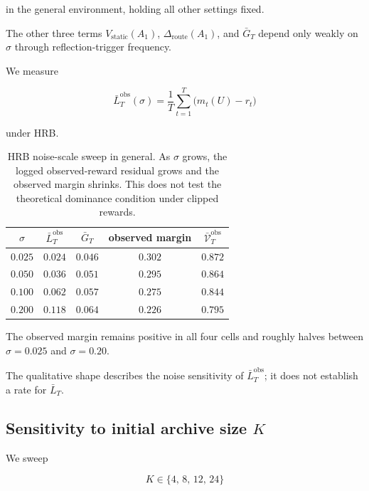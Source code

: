 \documentclass{article} %
\begin{document}
in the general environment, holding all other settings fixed.

The other three terms $V_{\mathrm{static}}(A_1)$, $\Delta_{\mathrm{route}}(A_1)$, and $\bar{G}_T$ depend only weakly on $\sigma$ through reflection-trigger frequency.

We measure

\begin{equation}
\label{eq:app-LT-of-sigma}
\bar L_T^{\mathrm{obs}}(\sigma)
=
\frac{1}{T}\sum_{t=1}^{T}\bigl(m_t(U)-r_t\bigr)
\end{equation}

under HRB.

\begin{table}[h]
\centering
\small
\begin{tabular}{ccccc}
\toprule
$\sigma$ & $\bar L_T^{\mathrm{obs}}$ & $\bar G_T$ & observed margin & $\bar{\mathcal V}_T^{\mathrm{obs}}$ \\
\midrule
$0.025$ & $0.024$ & $0.046$ & $0.302$ & $0.872$ \\
$0.050$ & $0.036$ & $0.051$ & $0.295$ & $0.864$ \\
$0.100$ & $0.062$ & $0.057$ & $0.275$ & $0.844$ \\
$0.200$ & $0.118$ & $0.064$ & $0.226$ & $0.795$ \\
\bottomrule
\end{tabular}
\caption{HRB noise-scale sweep in general. As \(\sigma\) grows, the logged
observed-reward residual grows and the observed margin shrinks. This does not
test the theoretical dominance condition under clipped rewards.}
\label{tab:app-sigma-sweep}
\end{table}

The observed margin remains positive in all four cells and roughly halves
between \(\sigma=0.025\) and \(\sigma=0.20\).

The qualitative shape describes the noise sensitivity of
\(\bar L_T^{\mathrm{obs}}\); it does not establish a rate for \(\bar L_T\).

\subsection{\texorpdfstring{Sensitivity to initial archive size $K$}{Sensitivity to initial archive size K}}

\label{app:K-sweep}

We sweep

\begin{equation}
\label{eq:app-K-grid}
K \in \{4,\, 8,\, 12,\, 24\}
\end{equation}
\end{document}
